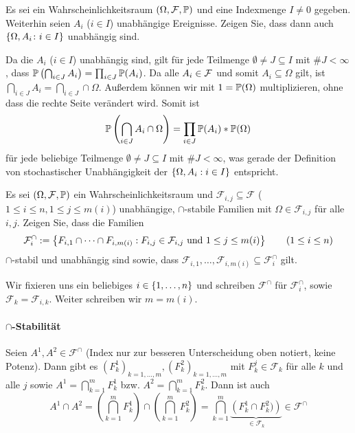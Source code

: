 \begin{exercisePage}
	\begin{homework}
		Es sei ein Wahrscheinlichkeitsraum $(\Omega, \ereignisF, \P)$ und eine Indexmenge $I \neq 0$ gegeben. Weiterhin seien $A_i$ ($i \in I$) unabhängige Ereignisse. Zeigen Sie, dass dann auch $\menge{\Omega, A_i \colon i \in I}$ unabhängig sind.
	\end{homework}
	
	Da die $A_i$ ($i \in I$) unabhängig sind, gilt für jede Teilmenge $\emptyset \neq J \subseteq I$ mit $\# J < \infty$, dass $\P\left( \bigcap_{i \in J} A_i \right) = \prod_{i \in J} \P(A_i)$. Da alle $A_i \in \ereignisF$ und somit $A_i \subseteq \Omega$ gilt, ist $\bigcap_{i \in J} A_i = \bigcap_{i \in J} \cap \Omega$. Außerdem können wir mit $1 = \P(\Omega)$ multiplizieren, ohne dass die rechte Seite verändert wird. Somit ist
	\begin{equation*}
		\P \left( \bigcap_{i \in J} A_i \cap \Omega \right) = \prod_{i \in J} \P(A_i) * \P(\Omega)
	\end{equation*}
	für jede beliebige Teilmenge $\emptyset \neq J \subseteq I$ mit $\# J < \infty$, was gerade der Definition von stochastischer Unabhängigkeit der $\menge{\Omega , A_i : i \in I}$ entspricht.
	
	\begin{homework}
		Es sei $(\Omega, \ereignisF, \P)$ ein Wahrscheinlichkeitsraum und $\mathcal{F}_{i,j} \subseteq \mathcal{F}$ ($1 \leq i \leq n , 1 \leq j \leq m(i)$) unabhängige, $\cap$-stabile Familien mit $\Omega \in \mathcal{F}_{i,j}$ für alle $i,j$. Zeigen Sie, dass die Familien
		\begin{equation*}
			\mathcal{F}_i^\cap \defeq \menge{F_{i,1} \cap \dots \cap F_{i,m(i)} : F_{i,j} \in \mathcal{F}_{i,j} \und 1 \leq j \leq m(i)} \qquad (1 \leq i \leq n)
		\end{equation*}
		$\cap$-stabil und unabhängig sind sowie, dass $\mathcal{F}_{i,1}, \dots , \mathcal{F}_{i,m(i)} \subseteq \mathcal{F}_i^\cap$ gilt.
	\end{homework}
	
	Wir fixieren uns ein beliebiges $i \in \menge{1, \dots, n}$ und schreiben $\mathcal{F}^\cap$ für $\mathcal{F}_i^\cap$, sowie $\mathcal{F}_k = \mathcal{F}_{i,k}$. Weiter schreiben wir $m = m(i)$.
	
	\paragraph{$\cap$-Stabilität}
	Seien $A^1, A^2 \in \mathcal{F}^\cap$ (Index nur zur besseren Unterscheidung oben notiert, keine Potenz). Dann gibt es $(F_k^1)_{k = 1, \dots , m} , (F_k^2)_{k = 1, \dots , m}$ mit $F_k^j \in \mathcal{F}_k$ für alle $k$ und alle $j$ sowie $A^1 = \bigcap_{k=1}^m F_k^1$ bzw. $A^2 = \bigcap_{k=1}^m F_k^2$. Dann ist auch
	\begin{equation*}
		A^1 \cap A^2 = \left( \bigcap_{k=1}^m F_k^1 \right) \cap \left( \bigcap_{k=1}^m  F_k^2 \right) = \bigcap_{k=1}^m \underbrace{\left( F_k^1 \cap F_k^2) \right)}_{\in \mathcal{F}_k} \in \mathcal{F}^\cap
	\end{equation*}
	

\end{exercisePage}
